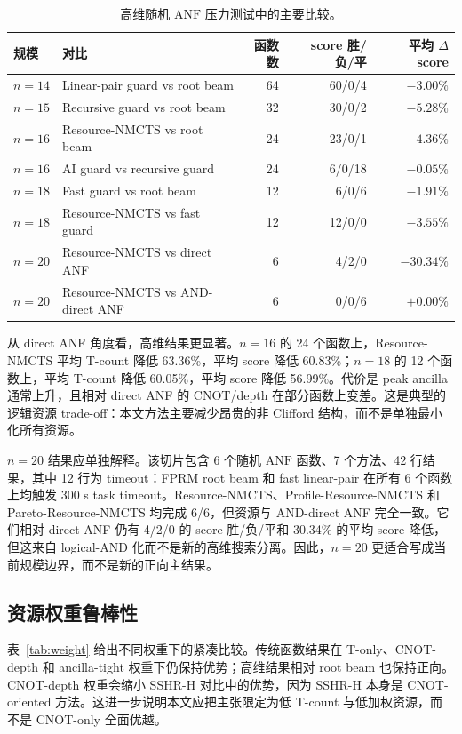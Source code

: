 \documentclass[UTF8,fontset=macnew,11pt]{ctexart}
\newcommand{\method}{Resource-NMCTS}
\newcommand{\pareto}{Pareto-Resource-NMCTS}
\newcommand{\anf}{\ensuremath{\mathrm{ANF}}}
\begin{document}
\begin{table}[t]
\centering
\small
\caption{高维随机 \anf{} 压力测试中的主要比较。}
\label{tab:highdim}
\begin{tabularx}{\linewidth}{llrrr}
\toprule
规模 & 对比 & 函数数 & score 胜/负/平 & 平均 $\Delta$ score \\
\midrule
$n=14$ & Linear-pair guard vs root beam & 64 & 60/0/4 & $-3.00\%$ \\
$n=15$ & Recursive guard vs root beam & 32 & 30/0/2 & $-5.28\%$ \\
$n=16$ & \method{} vs root beam & 24 & 23/0/1 & $-4.36\%$ \\
$n=16$ & AI guard vs recursive guard & 24 & 6/0/18 & $-0.05\%$ \\
$n=18$ & Fast guard vs root beam & 12 & 6/0/6 & $-1.91\%$ \\
$n=18$ & \method{} vs fast guard & 12 & 12/0/0 & $-3.55\%$ \\
$n=20$ & \method{} vs direct ANF & 6 & 4/2/0 & $-30.34\%$ \\
$n=20$ & \method{} vs AND-direct ANF & 6 & 0/0/6 & $+0.00\%$ \\
\bottomrule
\end{tabularx}
\end{table}

从 direct ANF 角度看，高维结果更显著。$n=16$ 的 24 个函数上，\method{} 平均 T-count 降低 63.36\%，平均 score 降低 60.83\%；$n=18$ 的 12 个函数上，平均 T-count 降低 60.05\%，平均 score 降低 56.99\%。代价是 peak ancilla 通常上升，且相对 direct ANF 的 CNOT/depth 在部分函数上变差。这是典型的逻辑资源 trade-off：本文方法主要减少昂贵的非 Clifford 结构，而不是单独最小化所有资源。

$n=20$ 结果应单独解释。该切片包含 6 个随机 \anf{} 函数、7 个方法、42 行结果，其中 12 行为 timeout：FPRM root beam 和 fast linear-pair 在所有 6 个函数上均触发 300 s task timeout。\method{}、Profile-\method{} 和 \pareto{} 均完成 6/6，但资源与 AND-direct ANF 完全一致。它们相对 direct ANF 仍有 4/2/0 的 score 胜/负/平和 30.34\% 的平均 score 降低，但这来自 logical-AND 化而不是新的高维搜索分离。因此，$n=20$ 更适合写成当前规模边界，而不是新的正向主结果。

\subsection{资源权重鲁棒性}

表~\ref{tab:weight} 给出不同权重下的紧凑比较。传统函数结果在 T-only、CNOT-depth 和 ancilla-tight 权重下仍保持优势；高维结果相对 root beam 也保持正向。CNOT-depth 权重会缩小 SSHR-H 对比中的优势，因为 SSHR-H 本身是 CNOT-oriented 方法。这进一步说明本文应把主张限定为低 T-count 与低加权资源，而不是 CNOT-only 全面优越。
\end{document}
